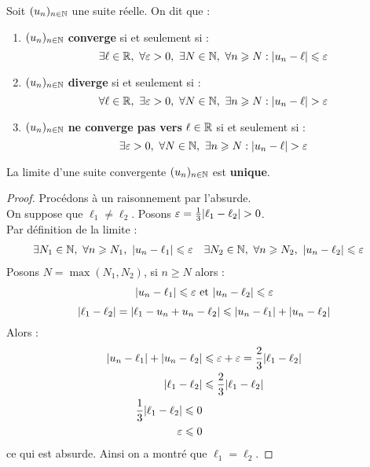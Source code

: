 \begin{definition}
    Soit $(u_n)_{n \in \mathbb{N}}$ une suite réelle. On dit que :
    \begin{enumerate}
        \item $(u_n)_{n \in \mathbb{N}}$ \textbf{converge} si et seulement si : 
        \[ \exists \ell \in \mathbb{R},\ \forall \varepsilon > 0,\ \exists N \in \mathbb{N},\ \forall n \geqslant N : \abs{u_n - \ell} \leqslant \varepsilon \]
        \item $(u_n)_{n \in \mathbb{N}}$ \textbf{diverge} si et seulement si : 
        \[ \forall \ell \in \mathbb{R},\ \exists \varepsilon > 0,\ \forall N \in \mathbb{N},\ \exists n \geqslant N : \abs{u_n - \ell} > \varepsilon \]
        \item $(u_n)_{n \in \mathbb{N}}$ \textbf{ne converge pas vers} $\ell \in \mathbb{R}$ si et seulement si : 
        \[ \exists \varepsilon > 0,\ \forall N \in \mathbb{N},\ \exists n \geqslant N : \abs{u_n - \ell} > \varepsilon \]
    \end{enumerate}
\end{definition}

\begin{theorem}
    La limite d'une suite convergente $(u_n)_{n \in \mathbb{N}}$ est \textbf{unique}.
\end{theorem}

\begin{proof}
    Procédons à un raisonnement par l'absurde.
    \\
    On suppose que $\ell_1 \neq \ell_2$. Posons $\varepsilon = \frac{1}{3} \abs{\ell_1 - \ell_2} > 0$.
    \\
    Par définition de la limite :
    \begin{align*}
        &\exists N_1 \in \mathbb{N},\ \forall n \geqslant N_1,\ \abs{u_n - \ell_1} \leqslant \varepsilon 
        &
        &\exists N_2 \in \mathbb{N},\ \forall n \geqslant N_2,\ \abs{u_n - \ell_2} \leqslant \varepsilon
    \end{align*}
    Posons $N = \max(N_1, N_2)$, si $n \geq N$ alors :
    \begin{align*}
        \abs{u_n - \ell_1} \leqslant \varepsilon \text{ et } \abs{u_n - \ell_2} \leqslant \varepsilon
    \end{align*}
    \[ \abs{\ell_1 - \ell_2} = \abs{\ell_1 - u_n + u_n - \ell_2} \leqslant \abs{u_n - \ell_1} + \abs{u_n - \ell_2} \]
    Alors : 
    \begin{align*}
        \abs{u_n - \ell_1} + \abs{u_n - \ell_2} &\leqslant \varepsilon + \varepsilon = \frac{2}{3} \abs{\ell_1 - \ell_2} \\
        \abs{\ell_1 - \ell_2} &\leqslant \frac{2}{3} \abs{\ell_1 - \ell_2} \\
        \frac{1}{3} \abs{\ell_1 - \ell_2} \leqslant 0 \\
        \varepsilon \leqslant 0
    \end{align*}
    ce qui est absurde. Ainsi on a montré que $\ell_1 = \ell_2$.
\end{proof}

